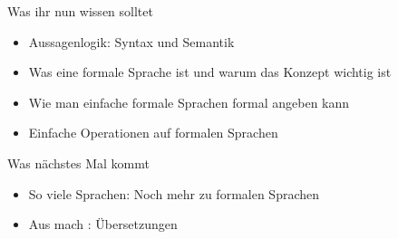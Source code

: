




\begin{frame}	
	\begin{block}{Was ihr nun wissen solltet}
		\begin{itemize}
			\item Aussagenlogik: Syntax und Semantik
			\item Was eine formale Sprache ist und warum das Konzept wichtig ist
			\item Wie man einfache formale Sprachen formal angeben kann
			\item Einfache Operationen auf formalen Sprachen
		\end{itemize}
	\end{block}
	
	\begin{block}{Was nächstes Mal kommt}
		\begin{itemize}
			\item So viele Sprachen: Noch mehr zu formalen Sprachen
			\item Aus  mach : Übersetzungen
		\end{itemize}
	\end{block}
\end{frame}

\slideThanks


